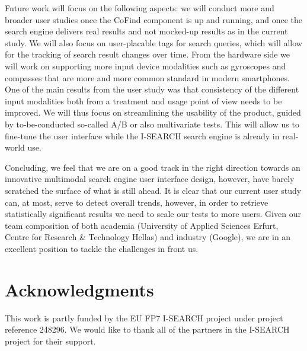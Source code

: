 \documentclass[runningheads,a4paper]{llncs} \usepackage[utf8]{inputenc}
\begin{document}
Future work will focus on the following aspects: we will conduct more and broader user studies once the \mbox{CoFind} component is up and running, and once the search engine delivers real results and not mocked-up results as in the current study. We will also focus on user-placable tags for search queries, which will allow for the tracking of search result changes over time. From the hardware side we will work on supporting more input device modalities such as gyroscopes and compasses that are more and more common standard in modern smartphones. One of the main results from the user study was that consistency of the different input modalities both from a treatment and usage point of view needs to be improved. We will thus focus on streamlining the usability of the product, guided by to-be-conducted so-called A/B or also multivariate tests. This will allow us to fine-tune the user interface while the \mbox{I-SEARCH} search engine is already in real-world use.

Concluding, we feel that we are on a good track in the right direction towards an innovative multimodal search engine user interface design, however, have barely scratched the surface of what is still ahead. It is clear that our current user study can, at most, serve to detect overall trends, however, in order to retrieve statistically significant results we need to scale our tests to more users. Given our team composition of both academia (University of Applied Sciences Erfurt, Centre for Research \& Technology Hellas) and industry (Google), we are in an excellent position to tackle the challenges in front us.

\section{Acknowledgments}
This work is partly funded by the EU FP7 \mbox{I-SEARCH} project under project reference 248296. We would like to thank all of the partners in the \mbox{I-SEARCH} project for their support.



\end{document}
